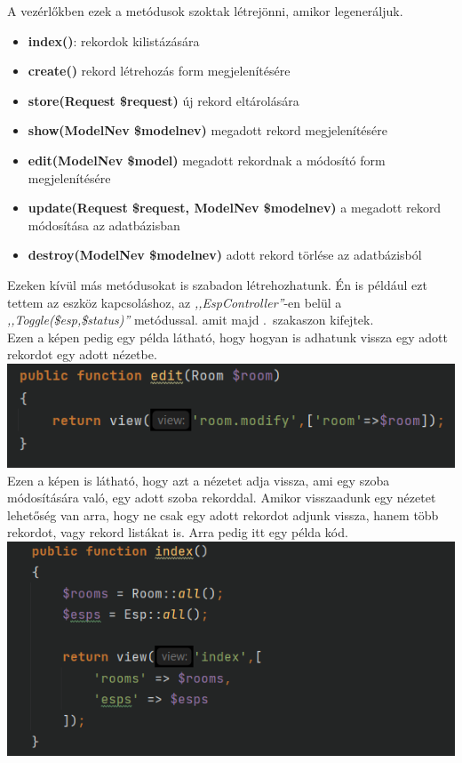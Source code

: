 \documentclass[
]{thesis-ekf}
\theoremstyle{definition}
\theoremstyle{remark}
\begin{document}
	A vezérlőkben ezek a metódusok szoktak létrejönni, amikor legeneráljuk.
	\begin{itemize}
		\item \textbf{index()}: rekordok kilistázására 
		\item \textbf{create()} rekord létrehozás form megjelenítésére 
		\item \textbf{store(Request \$request)} új rekord eltárolására 
		\item \textbf{show(ModelNev \$modelnev)} megadott rekord megjelenítésére 
		\item \textbf{edit(ModelNev \$model)} megadott rekordnak a módosító form megjelenítésére
		\item \textbf{update(Request \$request, ModelNev \$modelnev)} a megadott rekord módosítása az adatbázisban
		\item \textbf{destroy(ModelNev \$modelnev)} adott rekord törlése az adatbázisból
	\end{itemize}
	Ezeken kívül más metódusokat is szabadon létrehozhatunk. Én is például ezt tettem az eszköz kapcsoláshoz, az \emph{,,EspController''}-en belül a \emph{,,Toggle(\$esp,\$status)''} metódussal. amit majd .~szakaszon kifejtek.
	\\
	Ezen a képen pedig egy példa látható, hogy hogyan is adhatunk vissza egy adott rekordot egy adott nézetbe.
	\\
	\label{return-room}\includegraphics[width=1\textwidth]{./src/codes/return_view}
	\\
	Ezen a képen is látható, hogy azt a nézetet adja vissza, ami egy szoba módosítására való, egy adott szoba rekorddal. Amikor visszaadunk egy nézetet lehetőség van arra, hogy ne csak egy adott rekordot adjunk vissza, hanem több rekordot, vagy rekord listákat is. Arra pedig itt egy példa kód.
	\\
	\includegraphics[width=1\textwidth]{./src/codes/return_lists}
	
\end{document}
